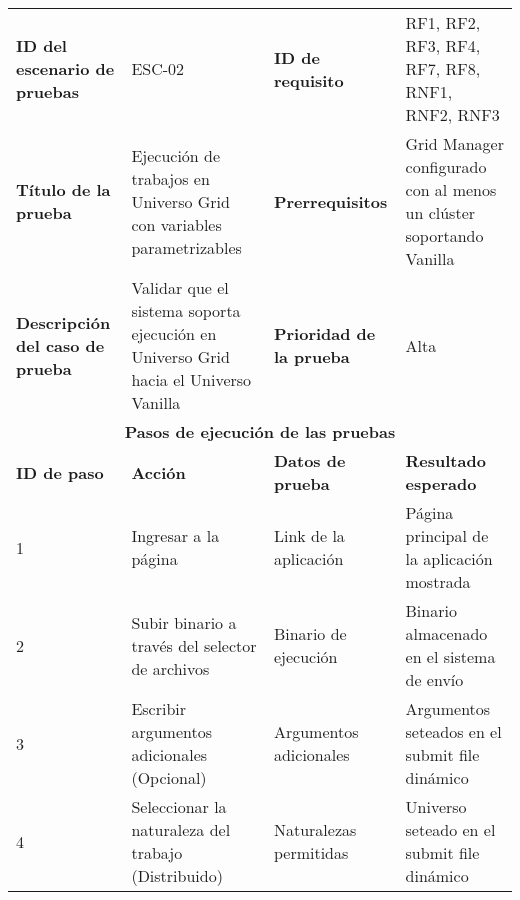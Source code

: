\begin{table}[H]
	\centering
	\renewcommand{\arraystretch}{1.2} %
	\fontsize{9pt}{10pt}\selectfont %
	\begin{tabular}{|p{2cm}|p{4cm}|p{2.5cm}|p{4.7cm}|} %
		\hline
		\textbf{ID del escenario de pruebas}    & ESC-02                                                                              & \textbf{ID de requisito}        & RF1, RF2, RF3, RF4, RF7, RF8, RNF1, RNF2, RNF3                      \\
		\textbf{Título de la prueba}            & Ejecución de trabajos en Universo Grid con variables parametrizables                & \textbf{Prerrequisitos}         & Grid Manager configurado con al menos un clúster soportando Vanilla \\
		\textbf{Descripción del caso de prueba} & Validar que el sistema soporta ejecución en Universo Grid hacia el Universo Vanilla & \textbf{Prioridad de la prueba} & Alta                                                                \\
		\hline
		\multicolumn{4}{|c|}{\textbf{Pasos de ejecución de las pruebas}}                                                                                                                                                                      \\
		\hline
		\textbf{ID de paso}                     & \textbf{Acción}                                                                     & \textbf{Datos de prueba}        & \textbf{Resultado esperado}                                         \\
		1                                       & Ingresar a la página                                                                & Link de la aplicación           & Página principal de la aplicación mostrada                          \\
		2                                       & Subir binario a través del selector de archivos                                     & Binario de ejecución            & Binario almacenado en el sistema de envío                           \\
		3                                       & Escribir argumentos adicionales (Opcional)                                          & Argumentos adicionales          & Argumentos seteados en el submit file dinámico                      \\
		4                                       & Seleccionar la naturaleza del trabajo (Distribuido)                                 & Naturalezas permitidas          & Universo seteado en el submit file dinámico                         \\

\end{tabular}
\end{table}
